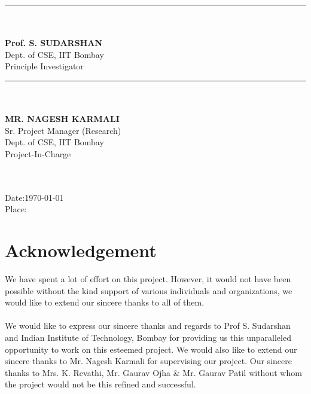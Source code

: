 \documentclass[12pt]{report}
\begin{document}
	\begin{multicols}{2}
		\noindent\rule{5cm}{0.4pt}\\
		\textbf{\\Prof. S. SUDARSHAN} \\
		Dept. of CSE, IIT Bombay \\
		Principle Investigator \\
		\columnbreak
		
		\noindent\rule{5cm}{0.4pt}\\
		\textbf{\\MR. NAGESH KARMALI} \\
		Sr. Project Manager (Research) \\
		Dept. of CSE, IIT Bombay \\
		Project-In-Charge \\
		\textbf{\\\\}
	\end{multicols}
	
	\begin{flushleft}
		Date:\today \\
		Place:
	\end{flushleft}
	\pagebreak
	
	\setcounter{page}{1}
	
	\section*{Acknowledgement}
	We have spent a lot of effort on this project. However, it would not have been possible without the kind support of various individuals and organizations, we would like to extend our sincere thanks to all of them.
	\\
	\\
	We would like to express our sincere thanks and regards to Prof S. Sudarshan and Indian Institute of Technology, Bombay for providing us this unparalleled opportunity to work on this esteemed project. We would also like to extend our sincere thanks to Mr. Nagesh Karmali for supervising our project. Our sincere thanks to Mrs. K. Revathi, Mr. Gaurav Ojha \& Mr. Gaurav Patil without whom the project would not be this refined and successful.
	\\ 
	\\
	
	\pagebreak
	
\end{document}
